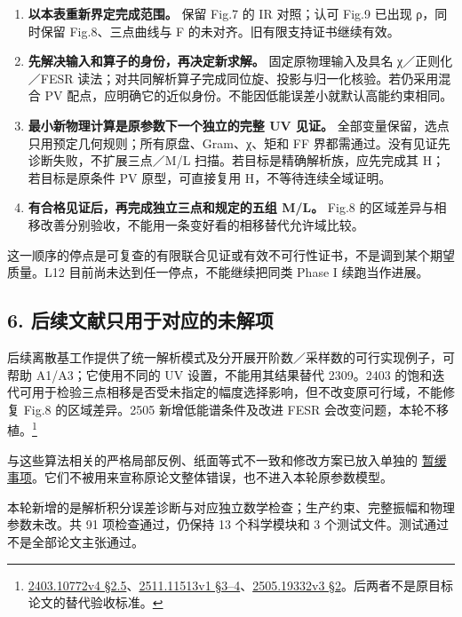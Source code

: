 \documentclass[
  11pt,
  a4paper,
]{article}
\providecommand{\tightlist}{%
  \setlength{\itemsep}{0pt}\setlength{\parskip}{0pt}}
\begin{document}
\begin{enumerate}
\def\labelenumi{\arabic{enumi}.}
\tightlist
\item
  \textbf{以本表重新界定完成范围。} 保留 Fig.7 的 IR 对照；认可 Fig.9
  已出现 ρ，同时保留 Fig.8、三点曲线与 F
  的未对齐。旧有限支持证书继续有效。
\item
  \textbf{先解决输入和算子的身份，再决定新求解。} 固定原物理输入及具名
  χ／正则化／FESR
  读法；对共同解析算子完成同位旋、投影与归一化核验。若仍采用混合 PV
  配点，应明确它的近似身份。不能因低能误差小就默认高能约束相同。
\item
  \textbf{最小新物理计算是原参数下一个独立的完整 UV 见证。}
  全部变量保留，选点只用预定几何规则；所有原盘、Gram、χ、矩和 FF
  界都需通过。没有见证先诊断失败，不扩展三点／M/L
  扫描。若目标是精确解析族，应先完成其 H；若目标是原条件 PV
  原型，可直接复用 H，不等待连续全域证明。
\item
  \textbf{有合格见证后，再完成独立三点和规定的五组 M/L。} Fig.8
  的区域差异与相移改善分别验收，不能用一条变好看的相移替代允许域比较。
\end{enumerate}

这一顺序的停点是可复查的有限联合见证或有效不可行性证书，不是调到某个期望质量。L12
目前尚未达到任一停点，不能继续把同类 Phase I 续跑当作进展。

\subsection{6.
后续文献只用于对应的未解项}\label{ux540eux7eedux6587ux732eux53eaux7528ux4e8eux5bf9ux5e94ux7684ux672aux89e3ux9879}

后续离散基工作提供了统一解析模式及分开展开阶数／采样数的可行实现例子，可帮助
A1/A3；它使用不同的 UV 设置，不能用其结果替代 2309。2403
的饱和迭代可用于检验三点相移是否受未指定的幅度选择影响，但不改变原可行域，不能修复
Fig.8 的区域差异。2505 新增低能谱条件及改进 FESR
会改变问题，本轮不移植。\footnote{\href{https://arxiv.org/html/2403.10772v4\#S2.SS5}{2403.10772v4
  §2.5}、\href{https://arxiv.org/html/2511.11513v1\#S3}{2511.11513v1
  §3--4}、\href{https://arxiv.org/html/2505.19332v3\#S2}{2505.19332v3
  §2}。后两者不是原目标论文的替代验收标准。}

与这些算法相关的严格局部反例、纸面等式不一致和修改方案已放入单独的
\href{HELD_ISSUES_ZH.md}{暂缓事项}。它们不被用来宣称原论文整体错误，也不进入本轮原参数模型。

本轮新增的是解析积分误差诊断与对应独立数学检查；生产约束、完整振幅和物理参数未改。共
91 项检查通过，仍保持 13 个科学模块和 3
个测试文件。测试通过不是全部论文主张通过。
\end{document}
